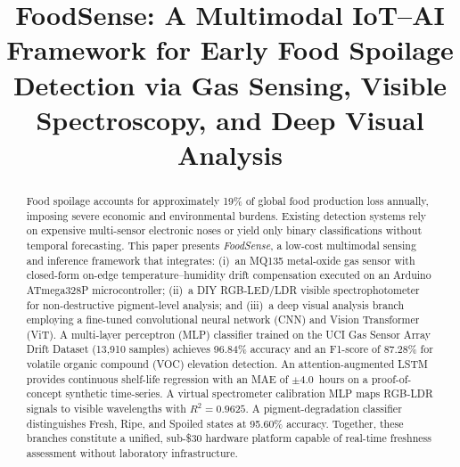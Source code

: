 \documentclass[conference]{IEEEtran}
\begin{document}
\title{FoodSense: A Multimodal IoT--AI Framework for Early Food Spoilage
Detection via Gas Sensing, Visible Spectroscopy, and Deep Visual Analysis}

\author{
  \and
  \and
  \and
  \and
}

\maketitle

\begin{abstract}
Food spoilage accounts for approximately 19\% of global food production
loss annually, imposing severe economic and environmental burdens.
Existing detection systems rely on expensive multi-sensor electronic
noses or yield only binary classifications without temporal forecasting.
This paper presents \textit{FoodSense}, a low-cost multimodal sensing and
inference framework that integrates: (i)~an MQ135 metal-oxide gas sensor
with closed-form on-edge temperature--humidity drift compensation
executed on an Arduino ATmega328P microcontroller; (ii)~a DIY
RGB-LED/LDR visible spectrophotometer for non-destructive pigment-level
analysis; and (iii)~a deep visual analysis branch employing a
fine-tuned convolutional neural network (CNN) and Vision Transformer
(ViT). A multi-layer perceptron (MLP) classifier trained on the UCI Gas
Sensor Array Drift Dataset (13,910 samples) achieves 96.84\% accuracy
and an F1-score of 87.28\% for volatile organic compound (VOC) elevation
detection. An attention-augmented LSTM provides continuous shelf-life
regression with an MAE of $\pm$4.0~hours on a proof-of-concept synthetic
time-series. A virtual spectrometer calibration MLP maps RGB-LDR signals
to visible wavelengths with $R^2{=}0.9625$. A pigment-degradation
classifier distinguishes Fresh, Ripe, and Spoiled states at 95.60\%
accuracy. Together, these branches constitute a unified, sub-\$30
hardware platform capable of real-time freshness assessment without
laboratory infrastructure.
\end{abstract}
\end{document}
